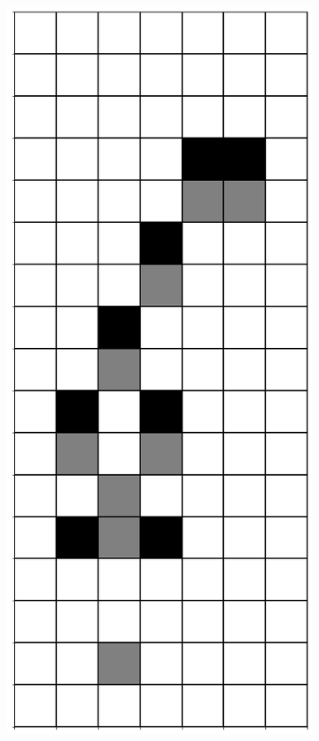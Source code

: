\documentclass[12pt]{article}
\numberwithin{figure}{section} %
\begin{document}
\begin{figure}[H]
\begin{subfigure}{0.3\textwidth}
     		\subcaption{}
   	\end{subfigure}
     	\begin{subfigure}{0.3\textwidth}
     		\centering
     		\includegraphics[angle=270,width=\linewidth]{Section4/14.1}

\end{subfigure}
\end{figure}
\end{document}
